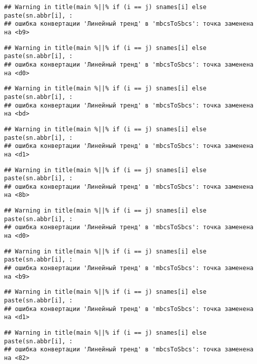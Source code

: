 \documentclass[
]{article}
\begin{document}
\begin{verbatim}
## Warning in title(main %||% if (i == j) snames[i] else paste(sn.abbr[i], :
## ошибка конвертации 'Линейный тренд' в 'mbcsToSbcs': точка заменена на <b9>
\end{verbatim}

\begin{verbatim}
## Warning in title(main %||% if (i == j) snames[i] else paste(sn.abbr[i], :
## ошибка конвертации 'Линейный тренд' в 'mbcsToSbcs': точка заменена на <d0>
\end{verbatim}

\begin{verbatim}
## Warning in title(main %||% if (i == j) snames[i] else paste(sn.abbr[i], :
## ошибка конвертации 'Линейный тренд' в 'mbcsToSbcs': точка заменена на <bd>
\end{verbatim}

\begin{verbatim}
## Warning in title(main %||% if (i == j) snames[i] else paste(sn.abbr[i], :
## ошибка конвертации 'Линейный тренд' в 'mbcsToSbcs': точка заменена на <d1>
\end{verbatim}

\begin{verbatim}
## Warning in title(main %||% if (i == j) snames[i] else paste(sn.abbr[i], :
## ошибка конвертации 'Линейный тренд' в 'mbcsToSbcs': точка заменена на <8b>
\end{verbatim}

\begin{verbatim}
## Warning in title(main %||% if (i == j) snames[i] else paste(sn.abbr[i], :
## ошибка конвертации 'Линейный тренд' в 'mbcsToSbcs': точка заменена на <d0>
\end{verbatim}

\begin{verbatim}
## Warning in title(main %||% if (i == j) snames[i] else paste(sn.abbr[i], :
## ошибка конвертации 'Линейный тренд' в 'mbcsToSbcs': точка заменена на <b9>
\end{verbatim}

\begin{verbatim}
## Warning in title(main %||% if (i == j) snames[i] else paste(sn.abbr[i], :
## ошибка конвертации 'Линейный тренд' в 'mbcsToSbcs': точка заменена на <d1>
\end{verbatim}

\begin{verbatim}
## Warning in title(main %||% if (i == j) snames[i] else paste(sn.abbr[i], :
## ошибка конвертации 'Линейный тренд' в 'mbcsToSbcs': точка заменена на <82>
\end{verbatim}
\end{document}
